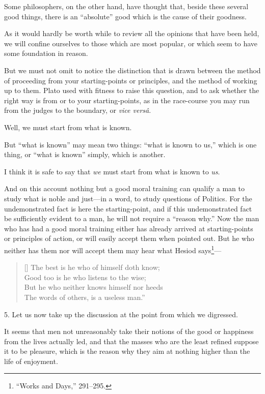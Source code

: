 Some philosophers, on the other hand, have thought that, beside these
several good things, there is an ``absolute'' good which is the cause
of their goodness.

As it would hardly be worth while to review all the opinions that have
been held, we will confine ourselves to those which are most popular,
or which seem to have some foundation in reason.

But we must not omit to notice the distinction that is drawn
between the method of proceeding from your starting-points or
principles, and the method of working up to them. Plato used with
fitness to raise this question, and to ask whether the right way is
from or to your starting-points, as in the race-course you may run
from the judges to the boundary, or \textit{vice vers\^a}.

Well, we must start from what is known.

But ``what is known'' may mean two things: ``what is known to us,''
which is one thing, or ``what is known'' simply, which is another.

I think it is safe to say that \textit{we} must start from what is
known to \textit{us}.

And on this account nothing but a good moral training can qualify a
man to study what is noble and just---in a word, to study questions of
Politics. For the undemonstrated fact is here the starting-point, and
if this undemonstrated fact be sufficiently evident to a man, he will
not require a ``reason why.'' Now the man who has had a good moral
training either has already arrived at starting-points or principles
of action, or will easily accept them when pointed out. But he who
neither has them nor will accept them may hear what Hesiod
says\footnote{``Works and Days,'' 291--295.}---

\settowidth{}
\begin{verse}[\versewidth]
The best is he who of himself doth know;\\
Good too is he who listens to the wise;\\
But he who neither knows himself nor heeds\\
The words of others, is a useless man.''
\end{verse}

5. Let us now take up the discussion at the point from which we
digressed.

It seems that men not unreasonably take their notions of the
good or happiness from the lives actually led, and that the masses who
are the least refined suppose it to be pleasure, which is the reason
why they aim at nothing higher than the life of enjoyment.


